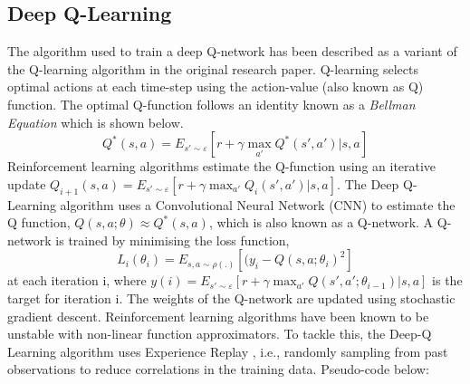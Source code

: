 \documentclass{svproc}
\begin{document}
\subsection{Deep Q-Learning}
The algorithm used to train a deep Q-network has been described as a variant of the Q-learning algorithm in the original research paper. Q-learning selects optimal actions at each time-step using the action-value (also known as Q) function. The optimal Q-function follows an identity known as a \textit{Bellman Equation} which is shown below.
\begin{equation}
    Q^{*}(s,a) = E_{s'\sim\varepsilon}[r + \gamma \max_{a'}Q^{*}(s',a')| s,a]
\end{equation}
Reinforcement learning algorithms estimate the Q-function using an iterative update \(Q_{i+1}(s,a)=E_{s'\sim\varepsilon}[r + \gamma \max_{a'}Q_{i}(s',a')| s,a] \). The Deep Q-Learning algorithm uses a Convolutional Neural Network (CNN) to estimate the Q function, \(Q(s,a;\theta)\approx Q^{*}(s,a) \), which is also known as a Q-network. A Q-network is trained by minimising the loss function, 
\begin{equation}
   L_{i}(\theta_{i})=E_{s,a\sim\rho(.)}[(y_{i}-Q(s,a;\theta_{i})^2] 
\end{equation}
at each iteration i, where \(y(i)= E_{s'\sim\varepsilon}[r + \gamma \max_{a'}Q(s',a';\theta_{i-1})| s,a]\) is the target for iteration i. The weights of the Q-network are updated using stochastic gradient descent. Reinforcement learning algorithms have been known to be unstable with non-linear function approximators. To tackle this, the Deep-Q Learning algorithm uses Experience Replay \citep{lin1993reinforcement}, i.e., randomly sampling from past observations to reduce correlations in the training data. Pseudo-code below:
\end{document}
